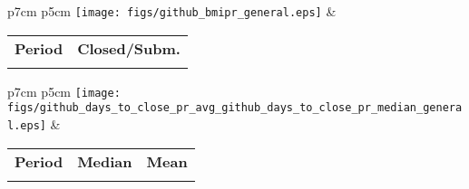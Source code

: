 \begin{tabular}{p{7cm} p{5cm}}
	\vspace{0pt} 
	\texttt{[image: figs/github\_bmipr\_general.eps]}
	& 
	\vspace{0pt}
	\begin{tabular}{l|l}%
		\bfseries Period & \bfseries Closed/Subm. %
		\csvreader[head to column names]{data/github_bmipr_general.csv}{}%
		{\\ & \bmipr}
	\end{tabular}
\end{tabular}




\begin{tabular}{p{7cm} p{5cm}}
	\vspace{0pt} 
	\texttt{[image: figs/github\_days\_to\_close\_pr\_avg\_github\_days\_to\_close\_pr\_median\_general.eps]}
	& 
	\vspace{0pt}
	\begin{tabular}{l|r|r|}%
		\bfseries Period & \bfseries Median & \bfseries Mean %
		\csvreader[head to column names]{data/github_days_to_close_pr_avg_github_days_to_close_pr_median_general.csv}{}%
		{\\ & \daystocloseprmedian & \daystoclosepravg}
	\end{tabular}
\end{tabular}
